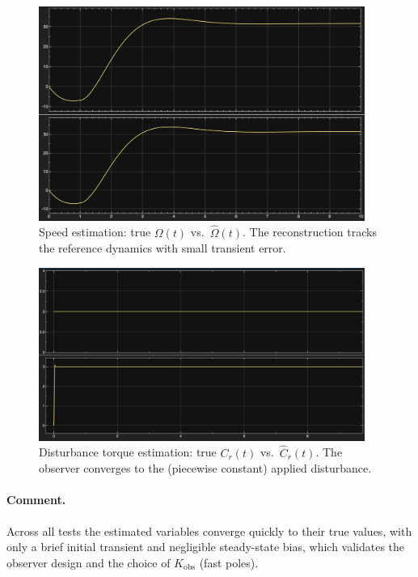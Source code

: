 \documentclass{rapportCS}
\begin{document}
\begin{figure}[H]
\centering
\includegraphics[width=0.95\textwidth]{figures/simulinkspeed.png}
\caption{Speed estimation: true $\Omega(t)$ vs.\ $\hat\Omega(t)$. The reconstruction tracks the reference dynamics with small transient error.}
\label{fig:obs_Omega}
\end{figure}

\begin{figure}[H]
\centering
\includegraphics[width=0.95\textwidth]{figures/simulinkdisturbance.png}
\caption{Disturbance torque estimation: true $C_r(t)$ vs.\ $\hat C_r(t)$. The observer converges to the (piecewise constant) applied disturbance.}
\label{fig:obs_Cr}
\end{figure}

\paragraph{Comment.}
Across all tests the estimated variables converge quickly to their true values, with only a brief
initial transient and negligible steady-state bias, which validates the observer design and the choice of
$K_{\mathrm{obs}}$ (fast poles).
\end{document}
